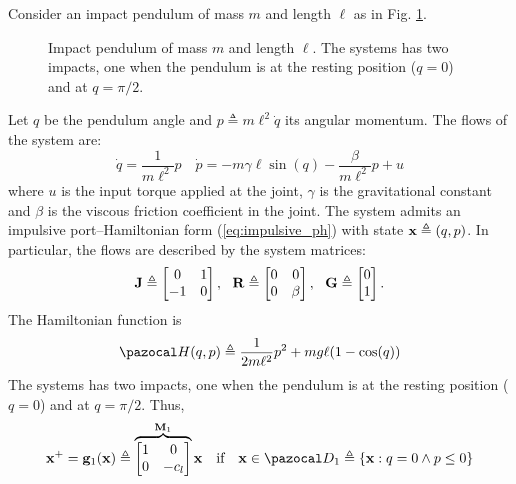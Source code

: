 %
\begin{exmp}\label{ex:ipend}
    Consider an impact pendulum of mass $m$ and length $\ell$ as in Fig. \ref{fig:ipend}.
    \begin{figure}
        \centering
        
        \caption[Impact pendulum]{Impact pendulum of mass $m$ and length $\ell$. The systems has two impacts, one when the pendulum is at the resting position ($q=0$) and at $q = \pi/2$.}
        \label{fig:ipend}
    \end{figure}
    Let $q$ be the pendulum angle and $p \triangleq m \ell^2 \dot{q}$ its angular momentum. The flows of the system are:
    \begin{equation}
        \dot{q} = \frac{1}{m\ell^2}p \quad
        \dot{p} = -m\gamma\ell\sin(q)-\frac{\beta}{m\ell^2}p + u
    \end{equation}
    where $u$ is the input torque applied at the joint, $\gamma$ is the gravitational constant and $\beta$ is the viscous friction coefficient in the joint. The system admits an impulsive port--Hamiltonian form (\ref{eq:impulsive_ph}) with state $\mathbf{x}\triangleq(q,p)$. In particular, the flows are described by the system matrices:
    \begin{equation}
        \mathbf{J}\triangleq\begin{bmatrix}0&1\\-1&0\end{bmatrix},~~\mathbf{R}\triangleq \begin{bmatrix}0&0\\0&\beta\end{bmatrix},~~\mathbf{G}\triangleq\begin{bmatrix}0\\1\end{bmatrix}.
    \end{equation}
    The Hamiltonian function is 
    \begin{equation}
        \Ha(q,p)\triangleq\frac{1}{2m\ell^2}p^2 + mg\ell(1-\cos(q))
    \end{equation}
    The systems has two impacts, one when the pendulum is at the resting position ($q=0$) and at $q = \pi/2$. Thus,
    \begin{align}
        &\xb^+ = \mathbf{g}_1(\xb) \triangleq \overbrace{\begin{bmatrix}1&0\\0&-c_l\end{bmatrix}}^{\mathbf{M}_1}\xb\quad\text{if}\quad\xb\in\D_1\triangleq\left\{\xb:q=0\land p\leq 0\right\} \\

\end{align}
\end{exmp}
